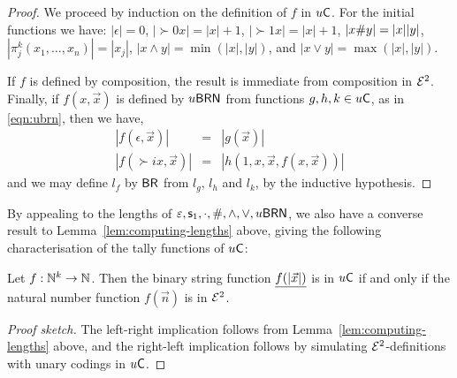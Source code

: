 \documentclass{lmcs}
\begin{document}
\begin{proof}
	We proceed by induction on the definition of $f$ in $u \mathsf{C}$.
	For the initial functions we have:	
	$| \epsilon | =  0$, 
	$| \succ 0 x| = |x| + 1$, 
	$| \succ 1 x| = |x| + 1$, 
	$|x \# y | = |x| |y|$, 
	$| \pi^k_j  (x_1 , \dots , x_n)| = |x_j|$, 
	$|x \wedge y| = \min(|x|, |y|)$, and 
	$| x \vee y | = \max (|x|, |y|)$.
	
	If $f$ is defined by composition, the result is immediate from composition in $\mathcal{E}^2$. 
	Finally, if $f(x, \vec x )$ is defined by $u\mathsf{BRN}$ from functions $g,h,k \in u \mathsf{C}$, as in \eqref{eqn:ubrn},
	then we have,
	\[
	\begin{array}{rcl}
	|f(\epsilon, \vec x)| & = & |g(\vec x)| \\
	|f(\succ i x , \vec x)| & = & |h(1 , x , \vec x , f(x , \vec x))|
	\end{array}
	\]
	and we may define $l_f$ by $\mathsf{BR}$ from $l_g$, $l_h$ and $l_k$, by the inductive hypothesis.
\end{proof}



\noindent
By appealing to the lengths of $\varepsilon, \mathsf s_{1}, \cdot, \#, \wedge, \vee, u\mathsf{BRN}$, we also have a converse result to Lemma~\ref{lem:computing-lengths} above, giving the following characterisation of the tally functions of $u \mathsf{C}$:
%


\begin{theorem}
	\label{thm:tally-fns-linspace}
	Let $f : \mathbb{N}^k \to \mathbb{N}$. Then the binary string function $\underline{f(| \vec x |)}$ is in $u \mathsf{C}$ if and only if the natural number function $f(\vec n)$ is in $ \mathcal{E}^2$.
\end{theorem}


\begin{proof}
		[Proof sketch]
	The left-right implication follows from Lemma~\ref{lem:computing-lengths} above, and the right-left implication follows by simulating $\mathcal{E}^2$-definitions with unary codings in $u \mathsf{C}$.
\end{proof}
\end{document}
